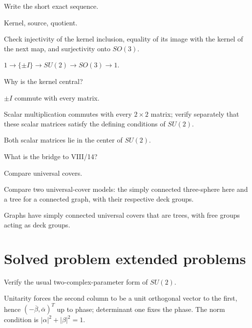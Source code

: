 \begin{exercise}\label{exr:viii13-22}
Write the short exact sequence.
\end{exercise}
\begin{hint}
Kernel, source, quotient.

Check injectivity of the kernel inclusion, equality of its image with the kernel of the next map, and surjectivity onto \(SO(3)\).
\end{hint}
\begin{solution}
\(1\to\{\pm I\}\to SU(2)\to SO(3)\to1\).
\end{solution}

\begin{exercise}\label{exr:viii13-23}
Why is the kernel central?
\end{exercise}
\begin{hint}
\(\pm I\) commute with every matrix.

Scalar multiplication commutes with every \(2\times2\) matrix; verify separately that these scalar matrices satisfy the defining conditions of \(SU(2)\).
\end{hint}
\begin{solution}
Both scalar matrices lie in the center of \(SU(2)\).
\end{solution}

\begin{exercise}\label{exr:viii13-24}
What is the bridge to VIII/14?
\end{exercise}
\begin{hint}
Compare universal covers.

Compare two universal-cover models: the simply connected three-sphere here and a tree for a connected graph, with their respective deck groups.
\end{hint}
\begin{solution}
Graphs have simply connected universal covers that are trees, with free groups acting as deck groups.
\end{solution}


\section{Solved problem extended problems}

\begin{problem}\label{prob:viii13-01}
Verify the usual two-complex-parameter form of \(SU(2)\).
\end{problem}
\begin{solution}
Unitarity forces the second column to be a unit orthogonal vector to the first, hence \((-\overline\beta,\overline\alpha)^T\) up to phase; determinant one fixes the phase. The norm condition is \(|\alpha|^2+|\beta|^2=1\).
\end{solution}

